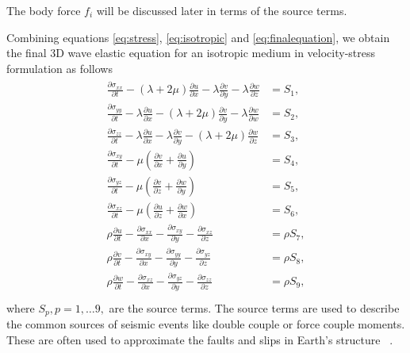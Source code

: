The body force $f_i$ will be discussed later in terms of the source terms. \\
\par Combining equations \ref{eq:stress}, \ref{eq:isotropic} and \ref{eq:finalequation}, we obtain the final 3D 
wave elastic equation for an isotropic medium in velocity-stress formulation as follows
\begin{align}
    \begin{split}
    \frac{\partial \sigma_{xx}}{\partial t} - \left(\lambda  + 2\mu\right)\frac{\partial u}{\partial x} - \lambda \frac{\partial v}{\partial y} - \lambda\frac{\partial w}{\partial z} &= S_1, \\    
    \frac{\partial \sigma_{yy}}{\partial t} - \lambda \frac{\partial u}{\partial x} - \left( \lambda + 2 \mu \right)\frac{\partial v}{\partial y} - \lambda \frac{\partial w}{\partial w} &= S_2, \\
    \frac{\partial \sigma_{zz}}{\partial t} - \lambda \frac{\partial u}{\partial x} - \lambda \frac{\partial v}{\partial y} - \left(\lambda + 2\mu\right)\frac{\partial w}{\partial z} &= S_3, \\
    \frac{\partial \sigma_{xy}}{\partial t} - \mu \left(\frac{\partial v}{\partial x} + \frac{\partial u}{\partial y}\right) &= S_4, \\ 
    \frac{\partial \sigma_{yz}}{\partial t} - \mu \left(\frac{\partial v}{\partial z} + \frac{\partial w}{\partial y}\right) &= S_5, \\
    \frac{\partial \sigma_{xz}}{\partial t} - \mu \left(\frac{\partial u}{\partial z} + \frac{\partial w}{\partial x}\right) &= S_6, \\
    \rho \frac{\partial u}{\partial t} - \frac{\partial \sigma_{xx}}{\partial x} - \frac{\partial \sigma_{xy}}{\partial y} - \frac{\partial \sigma_{xz}}{\partial z} &= \rho S_7, \\
    \rho \frac{\partial v}{\partial t} - \frac{\partial \sigma_{xy}}{\partial x} - \frac{\partial \sigma_{yy}}{\partial y} - \frac{\partial \sigma_{yz}}{\partial z} &= \rho S_8, \\
    \rho \frac{\partial w}{\partial t} - \frac{\partial \sigma_{xz}}{\partial x} - \frac{\partial \sigma_{yz}}{\partial y} - \frac{\partial \sigma_{zz}}{\partial z} &= \rho S_9, \\
\end{split}
\label{eq:setofequations}
\end{align}
where $S_p, p = 1,\dots9,$ are the source terms. The source terms are used to describe the common sources of seismic events like double couple or force couple moments.
These are often used to approximate the faults and slips in Earth's structure ~\parencite{shearer_2019}.

